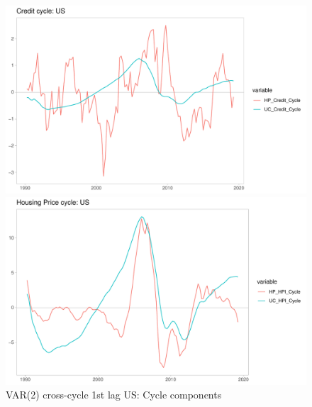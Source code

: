 \documentclass[fleqn]{article}
\begin{document}
\begin{outline}[enumerate]
		\begin{figure}[h!]
			\caption{VAR(2) cross-cycle 1st lag US: Cycle components}	
			\centerline{\includegraphics[scale=0.7]{../../Regression/VAR_2_crosscycle_1stlagonly/Output/Graphs/Credit_cycle_US.pdf}}
			\centerline{\includegraphics[scale=0.7]{../../Regression/VAR_2_crosscycle_1stlagonly/Output/Graphs/HP_Cycle_US.pdf}}
		\end{figure}
		

\end{outline}
\end{document}
